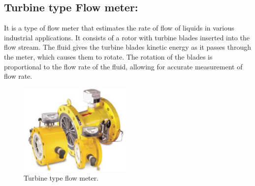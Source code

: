 \subsection{Turbine type Flow meter:}

It is a type of flow meter that estimates the rate of flow of liquids in
various industrial applications. It consists of a rotor with turbine
blades inserted into the flow stream. The fluid gives the turbine blades
kinetic energy as it passes through the meter, which causes them to
rotate. The rotation of the blades is proportional to the flow rate of
the fluid, allowing for accurate measurement of flow rate.

\begin{figure}[h!]
    \centering
    \includegraphics[width=2.18787in,height=1.76042in]{figs/flowmeters/image23.png}
    \caption{Turbine type flow meter.}
    \label{fig:Turbine type flow meter}
\end{figure}

